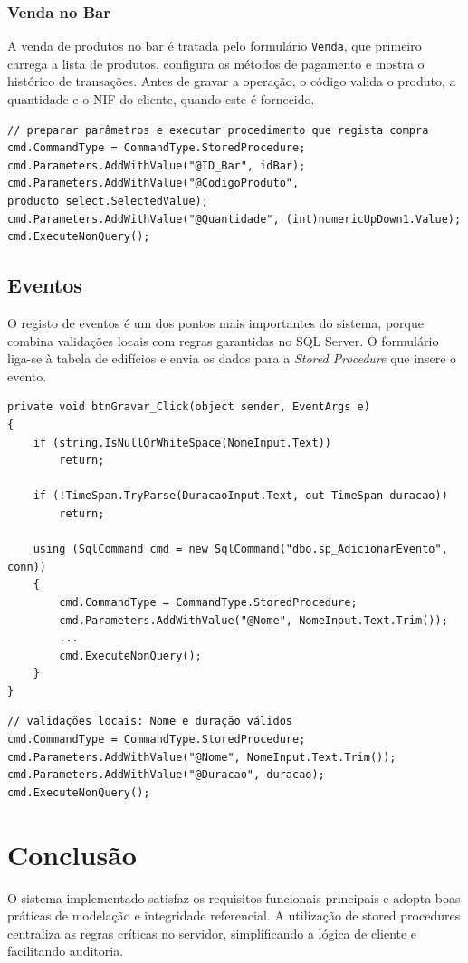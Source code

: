 \documentclass[11pt,a4paper]{article}
\begin{document}
\subsubsection{Venda no Bar}
A venda de produtos no bar é tratada pelo formulário \texttt{Venda}, que primeiro carrega a lista de produtos, configura os métodos de pagamento e mostra o histórico de transações. Antes de gravar a operação, o código valida o produto, a quantidade e o NIF do cliente, quando este é fornecido.

\begin{lstlisting}[language={[Sharp]C}, caption=Registo de venda no bar (excerto)]
// preparar parâmetros e executar procedimento que regista compra
cmd.CommandType = CommandType.StoredProcedure;
cmd.Parameters.AddWithValue("@ID_Bar", idBar);
cmd.Parameters.AddWithValue("@CodigoProduto", producto_select.SelectedValue);
cmd.Parameters.AddWithValue("@Quantidade", (int)numericUpDown1.Value);
cmd.ExecuteNonQuery();
\end{lstlisting}

\newpage
\subsection{Eventos}
O registo de eventos é um dos pontos mais importantes do sistema, porque combina validações locais com regras garantidas no SQL Server. O formulário liga-se à tabela de edifícios e envia os dados para a \textit{Stored Procedure} que insere o evento.

\begin{lstlisting}[language={[Sharp]C}, caption=Registo de eventos com validação local]
private void btnGravar_Click(object sender, EventArgs e)
{
    if (string.IsNullOrWhiteSpace(NomeInput.Text))
        return;

    if (!TimeSpan.TryParse(DuracaoInput.Text, out TimeSpan duracao))
        return;

    using (SqlCommand cmd = new SqlCommand("dbo.sp_AdicionarEvento", conn))
    {
        cmd.CommandType = CommandType.StoredProcedure;
        cmd.Parameters.AddWithValue("@Nome", NomeInput.Text.Trim());
        ...
        cmd.ExecuteNonQuery();
    }
}
\end{lstlisting}

\begin{lstlisting}[language={[Sharp]C}, caption=Registo de evento (excerto)]
// validações locais: Nome e duração válidos
cmd.CommandType = CommandType.StoredProcedure;
cmd.Parameters.AddWithValue("@Nome", NomeInput.Text.Trim());
cmd.Parameters.AddWithValue("@Duracao", duracao);
cmd.ExecuteNonQuery();
\end{lstlisting}


\section{Conclusão}
O sistema implementado satisfaz os requisitos funcionais principais e adopta boas práticas de modelação e integridade referencial. A utilização de stored procedures centraliza as regras críticas no servidor, simplificando a lógica de cliente e facilitando auditoria.
\end{document}
